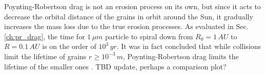 Poynting-Robertson drag is not an erosion process on its own, but since it acts to decrease the orbital distance of the grains in orbit around the Sun, it gradually increases the mass loss due to the true erosion processes. As evaluated in Sec. \ref{ch:pr_drag}, the time for $1 \, \si{\mu m}$ particle to spiral down from $R_0 = 1 \, \si{AU}$ to $R = 0.1 \, \si{AU}$ is on the order of $10^3 \, \si{yr}$. It was in fact concluded that while collisions limit the lifetime of grains $r \geq 10^{-3} \, \si{m}$, Poynting-Robertson drag limits the lifetime of the smaller ones \citep{whipple1967maintaining}. TBD update, perhaps a comparison plot? 